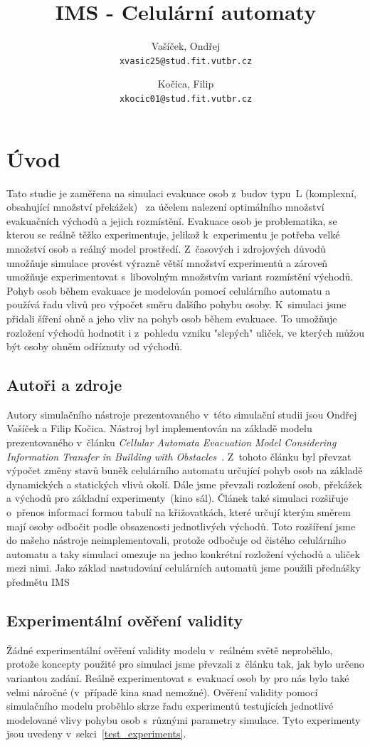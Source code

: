 \documentclass[11pt, titlepage, a4paper]{article}
\title{IMS - Celulární automaty}
\author{
    Vašíček, Ondřej\\
    \texttt{xvasic25@stud.fit.vutbr.cz}
    \and
    Kočica, Filip\\
    \texttt{xkocic01@stud.fit.vutbr.cz}
}
\begin{document}
\maketitle

\tableofcontents
\newpage

\section{Úvod}
Tato studie je zaměřena na simulaci evakuace osob z~budov typu~L (komplexní, obsahující množství překážek)~\cite{source_CA} za účelem nalezení optimálního množství evakuačních východů a jejich rozmístění. Evakuace osob je problematika, se kterou se reálně těžko experimentuje, jelikož k~experimentu je potřeba velké množství osob a reálný model prostředí. Z~časových i zdrojových důvodů umožňuje simulace provést výrazně větší množství experimentů a zároveň umožňuje experimentovat s~libovolným množstvím variant rozmístění východů. Pohyb osob během evakuace je modelován pomocí celulárního automatu a používá řadu vlivů pro výpočet směru dalšího pohybu osoby. K~simulaci jsme přidali šíření ohně a jeho vliv na pohyb osob během evakuace. To umožňuje rozložení východů hodnotit i z~pohledu vzniku "slepých" uliček, ve kterých můžou být osoby ohněm odříznuty od východů.


    \subsection{Autoři a zdroje}
    Autory simulačního nástroje prezentovaného v~této simulační studii jsou Ondřej Vašíček a Filip Kočica. Nástroj byl implementován na základě modelu prezentovaného v~článku \textit{Cellular Automata Evacuation Model Considering Information Transfer in Building with Obstacles}~\cite{source_CA}. Z~tohoto článku byl převzat výpočet změny stavů buněk celulárního automatu určující pohyb osob na základě dynamických a statických vlivů okolí. Dále jsme převzali rozložení osob, překážek a východů pro základní experimenty~(kino sál). Článek také simulaci rozšiřuje o~přenos informací formou tabulí na křižovatkách, které určují kterým směrem mají osoby odbočit podle obsazenosti jednotlivých východů. Toto rozšíření jsme do našeho nástroje neimplementovali, protože odbočuje od čistého celulárního automatu a taky simulaci omezuje na jedno konkrétní rozložení východů a uliček mezi nimi. Jako základ nastudování celulárních automatů jsme použili přednášky předmětu IMS~\cite{IMS}

    \subsection{Experimentální ověření validity}
    Žádné experimentální ověření validity modelu v~reálném světě neproběhlo, protože koncepty použité pro simulaci jsme převzali z~článku tak, jak bylo určeno variantou zadání. Reálně experimentovat s~evakuací osob by pro nás bylo také velmi náročné (v~případě kina snad nemožné). Ověření validity pomocí simulačního modelu proběhlo skrze řadu experimentů testujících jednotlivé modelované vlivy pohybu osob s~různými parametry simulace. Tyto experimenty jsou uvedeny v~sekci~\ref{test_experiments}.
\end{document}
